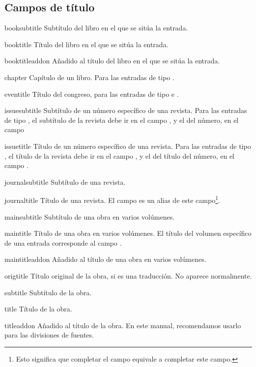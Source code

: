 \subsection{Campos de título}


\begin{choix}
	\item[booksubtitle]Subtítulo del libro en el que se sitúa la entrada.
   	\item[booktitle] Título del libro en el que se sitúa la entrada.
   	\item[booktitleaddon] Añadido al título del libro en el que se
          sitúa la entrada.
   	\item[chapter] Capítulo de un libro. Para las entradas de tipo .
   	\item[eventitle] Título del congreso, para las entradas de
          tipo  e .
   	\item[issuesubtitle] Subtítulo de un número específico de una
          revista.  Para las entradas de tipo , el
          subtítulo de la revista debe ir en el campo
          , y el del número, en el campo 
   	\item[issuetitle] Título de un número específico de una
          revista. Para las entradas de tipo , el
          título de la revista debe ir en el campo , y el
          del título del número, en el campo .
   	\item[journalsubtitle] Subtítulo de una revista.
   	\item[journaltitle] Título de una revista. El campo
           es un alias de este campo\footnote{Esto
            significa que completar el campo  equivale
            a completar este campo.}.
   	\item[mainsubtitle] Subtítulo de una obra en varios volúmenes.
   	\item[maintitle] Título de una obra en varios volúmenes. El
          título del volumen específico de una entrada corresponde al campo .
   	\item[maintitleaddon]  Añadido al título de una obra en varios
          volúmenes.
   	\item[origtitle] Título original de la obra, si es una
          traducción. No aparece normalmente.
   	\item[subtitle] Subtítulo de la obra.
   	\item[title] Título de la obra.
   	\item[titleaddon] Añadido al título de la obra. En este
          manual, recomendamos usarlo para las divisiones de
          fuentes.
\end{choix}

